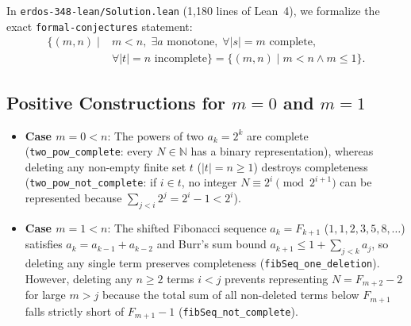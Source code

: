 \documentclass[10pt,twocolumn]{article}
\theoremstyle{definition}
\begin{document}
In \texttt{erdos-348-lean/Solution.lean} (1,180 lines of Lean~4), we formalize the exact \texttt{formal-conjectures} statement:
\begin{equation}
\begin{aligned}
  \bigl\{(m, n) \;\big|\; &m < n,\; \exists a\text{ monotone},\; \forall |s|=m\text{ complete},\\
  &\forall |t|=n\text{ incomplete}\bigr\}
  = \{(m, n) \mid m < n \wedge m \le 1\}.
\end{aligned}
\end{equation}

\subsection{Positive Constructions for $m = 0$ and $m = 1$}
\begin{itemize}[leftmargin=1.4em,itemsep=2pt]
  \item \textbf{Case $m = 0 < n$}: The powers of two $a_k = 2^k$ are complete (\texttt{two\_pow\_complete}: every $N \in \mathbb{N}$ has a binary representation), whereas deleting any non-empty finite set $t$ ($|t| = n \ge 1$) destroys completeness (\texttt{two\_pow\_not\_complete}: if $i \in t$, no integer $N \equiv 2^i \pmod{2^{i+1}}$ can be represented because $\sum_{j < i} 2^j = 2^i - 1 < 2^i$).
  \item \textbf{Case $m = 1 < n$}: The shifted Fibonacci sequence $a_k = F_{k+1}$ ($1, 1, 2, 3, 5, 8, \dots$) satisfies $a_k = a_{k-1} + a_{k-2}$ and Burr's sum bound $a_{k+1} \le 1 + \sum_{j < k} a_j$, so deleting any single term preserves completeness (\texttt{fibSeq\_one\_deletion}). However, deleting any $n \ge 2$ terms $i < j$ prevents representing $N = F_{m+2} - 2$ for large $m > j$ because the total sum of all non-deleted terms below $F_{m+1}$ falls strictly short of $F_{m+1} - 1$ (\texttt{fibSeq\_not\_complete}).
\end{itemize}
\end{document}
